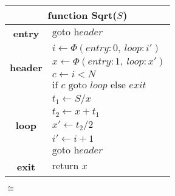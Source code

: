 \centering
{}
\begin{minipage}{0.43\textwidth}
\begin{tabular}{|cl|}
\multicolumn{2}{c}{{\bf function} Sqrt($S$)}\\
\hline
{\bf entry} & $\text{goto } \textit{header}$\\
\hline
\multirow{4}{*}{\bf header} & $i \leftarrow \Phi(\textit{entry}:0,\ \textit{loop}:i')$\\
                            & $x \leftarrow \Phi(\textit{entry}:1,\ \textit{loop}:x')$\\
                            & $c \leftarrow i<N$\\
                            & $\text{if }c\text{ goto }\textit{loop}\text{ else }exit$\\
\hline
\multirow{5}{*}{\bf loop} & $t_1\leftarrow S/x$\\
                          & $t_2\leftarrow x+t_1$\\
                          & $x'\leftarrow t_2/2$\\
                          & $i'\leftarrow i+1$\\
                          & $\text{goto }\textit{header}$\\
\hline
{\bf exit} & $\text{return }x$\\
\hline
\end{tabular}
\end{minipage}

\vspace{3.2mm}
{\huge
$\cong$}
\vspace{3.2mm}

